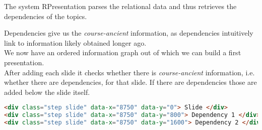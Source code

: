 \begin{frame}
\begin{module}[id=orderedInfoGraphs2]
The system RPresentation parses the relational data and thus retrieves the dependencies of the topics. 

Dependencies give us the \textit{course-ancient} information, as dependencies intuitively link to information likely obtained longer ago.\\

We now have an ordered information graph out of which we can build a first presentation. \\

After adding each slide it checks whether there is \textit{course-ancient} information, i.e. whether there are dependencies, for that slide. If there are dependencies those are added below the slide itself.\\

\begin{lstlisting}[language=HTML]
<div class="step slide" data-x="8750" data-y="0"> Slide </div>
<div class="step slide" data-x="8750" data-y="800"> Dependency 1 </div>
<div class="step slide" data-x="8750" data-y="1600"> Dependency 2 </div>
\end{lstlisting}

  \end{module}
\end{frame}
